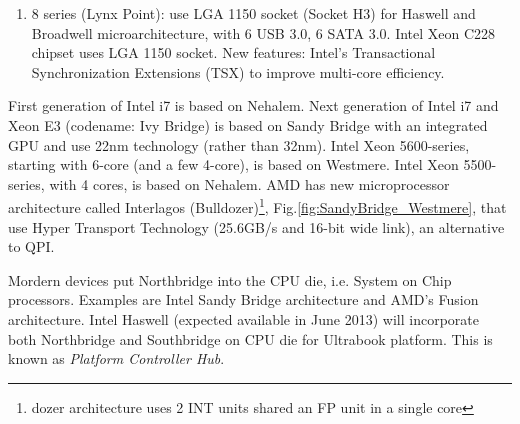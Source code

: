 \begin{enumerate}
\begin{itemize}
    \item Core i 6 series (Sandy Bridge chipsets): use 32nm technology, support
    DDR3-1333 (tested to work with DDR3-2133 also). Built-in GPU has 12
    execution units (EUs).
    
    Sandy Bridge-EN and Sandy Bridge-EP based Xeon E5. 
  
    \item Core i 7 series (Ivy Bridge chipsets: Sandy Bridge CPU is the new
    microarchitecture which is the replacement for previous Pentium families
    (P4,P5, P6, Nehalem). It uses 22nm technology with tri-gate transistors,
    support DDR3-1600, new random number generator RdRand instruction. Built-in
    GPU has 16 EUs, support OpenCL 1.1. Sandy Bridge is 64-bit, quad-core, dual
    threaded, 4 issue, out-of-order microprocessor with new AVX instruction
    (Advanced Vector eXtensions that support 256-bit FP, i.e. 3 and 4 operand).
    
    Ivy Bridge-E processors (2013) to have 12 cores and L3 cache 30MB. Xeon E5
    V2 to replace Xeon E5 Sandy Bridge.
    \end{itemize}
   
  \item 8 series (Lynx Point): use LGA 1150 socket (Socket H3) for Haswell and
  Broadwell microarchitecture, with 6 USB 3.0, 6 SATA 3.0. Intel Xeon C228
  chipset uses LGA 1150 socket. New features: Intel's Transactional
  Synchronization Extensions (TSX) to improve multi-core efficiency.
\end{enumerate}

\begin{framed}
First generation of Intel i7 is based on Nehalem. Next generation of
Intel i7 and Xeon E3 (codename: Ivy Bridge) is based on Sandy Bridge with an
integrated GPU and use 22nm technology (rather than 32nm).
Intel Xeon 5600-series, starting with 6-core (and a few 4-core), is based on
Westmere. Intel Xeon 5500-series, with 4 cores, is based on Nehalem.
AMD has new microprocessor architecture called Interlagos
(Bulldozer)\footnote{dozer architecture uses 2 INT units shared an FP unit in a
single core}, Fig.\ref{fig:SandyBridge_Westmere}, that use Hyper Transport
Technology (25.6GB/s and 16-bit wide link), an alternative to QPI.
\end{framed}

Mordern devices put Northbridge into the CPU die, i.e. System on Chip
processors. Examples are Intel Sandy Bridge architecture and AMD's Fusion
architecture. Intel Haswell (expected available in June 2013) will incorporate
both Northbridge and Southbridge on CPU die for Ultrabook platform. This is
known as {\it Platform Controller Hub}.

